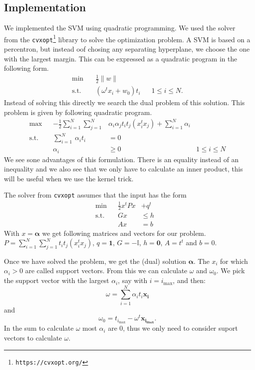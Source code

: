 \subsection{Implementation}
We implemented the SVM using quadratic programming. We used the solver from the \texttt{cvxopt\footnote{https://cvxopt.org/}} library to solve the optimization problem. A SVM is based on a percentron, but instead oof chosing any separating hyperplane, we choose the one with the largest margin. This can be expressed as a quadratic program in the following form.
\begin{align*}
	\min&&\, \frac{1}{2}\lVert w \rVert&&  \\
	\text{s.t.}&&\, (\omega^tx_i+w_0)t_i && 1 \leq i \leq N.
\end{align*}
Instead of solving this directly we search the dual problem of this solution. This problem is given by following quadratic program.
\begin{align*}
	\max&& - \frac{1}{2} \sum\limits_{i=1}^N \sum\limits_{j=1}^N&\alpha_i\alpha_jt_it_j(x_i^tx_j) +  \sum\limits_{i=1}^N \alpha_i &\\
	\text{s.t.}&& \sum\limits_{i=1}^N\ \alpha_i t_i &= 0& \\
	&&\alpha_i&\geq0& 1\leq i \leq N
\end{align*}
We see sone advantages of this formulation. There is an equality instead of an inequality and we also see that we only have to calculate an inner product, this will be useful when we use the kernel trick.

The solver from \texttt{cvxopt} assumes that the input has the form
\begin{align*}
	\min&& \frac{1}{2} x^tPx &+ q^t&\\
	\text{s.t.}&&Gx&\leq h& \\
	&&Ax&=b& 
\end{align*}
With $x=\bm{\alpha}$ we get following matrices and vectors for our problem. $P=\sum\limits_{i=1}^N \sum\limits_{j=1}^Nt_it_j(x_i^tx_j)$, $q=\bm{1}$, 
$G=-\mathbb{I}$, $h=\bm{0}$, $A=t^t$ and $b=0$.

Once we have solved the problem, we get the (dual) solution $\bm{\alpha}$. The $x_i$ for which $\alpha_i>0$ are called support vectors. From this we can calculate $\omega$ and $\omega_0$. We pick the support vector with the largest $\alpha_i$, say with $i = i_{\max}$, and then:
\[
	\omega = \sum\limits_{i=1}^N\alpha_i t_i \bm{x_i}
\]
and 
\[
	\omega_0 = t_{i_{\max}} - \omega^t\bm{x_{i_{\max}}}.
\]
In the sum to calculate $\omega$ most $\alpha_i$ are $0$, thus we only need to consider suport vectors to calculate $\omega$.

